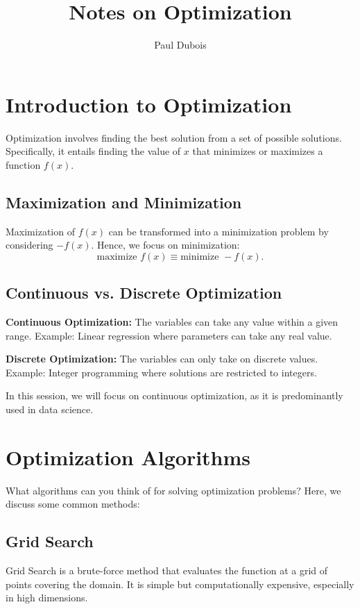 \documentclass[]{article}
\title{Notes on Optimization}
\author{Paul Dubois}
\date{}
\begin{document}
	
	\maketitle
	
	\begin{abstract}
		
	\end{abstract}
	
	\section*{Introduction to Optimization}
	Optimization involves finding the best solution from a set of possible solutions. Specifically, it entails finding the value of $x$ that minimizes or maximizes a function $f(x)$.
	
	\subsection*{Maximization and Minimization}
	Maximization of $f(x)$ can be transformed into a minimization problem by considering $-f(x)$. Hence, we focus on minimization:
	\[
	\text{maximize } f(x) \equiv \text{minimize } -f(x).
	\]
	
	\subsection*{Continuous vs. Discrete Optimization}
	\textbf{Continuous Optimization:} The variables can take any value within a given range. Example: Linear regression where parameters can take any real value.
	
	\textbf{Discrete Optimization:} The variables can only take on discrete values. Example: Integer programming where solutions are restricted to integers.
	
	In this session, we will focus on continuous optimization, as it is predominantly used in data science.
	
	\section*{Optimization Algorithms}
	What algorithms can you think of for solving optimization problems? Here, we discuss some common methods:
	
	\subsection*{Grid Search}
	Grid Search is a brute-force method that evaluates the function at a grid of points covering the domain. It is simple but computationally expensive, especially in high dimensions.
	
\end{document}
